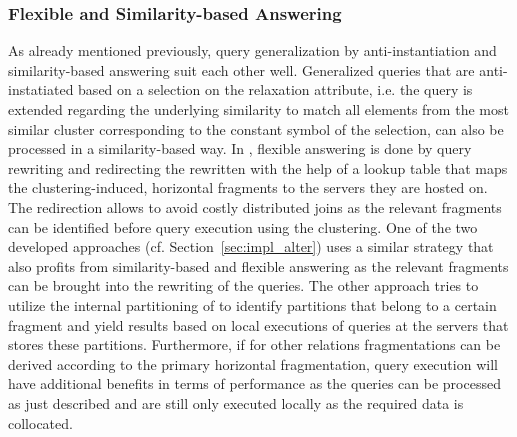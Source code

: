 \subsubsection{Flexible and Similarity-based Answering}
\label{sec:meth_fqa_fqsba}

As already mentioned previously, query generalization by anti-instantiation and similarity-based answering suit each other well. Generalized queries
that are anti-instatiated based on a selection on the relaxation attribute, i.e. the query is extended regarding the underlying similarity to match all
elements from the most similar cluster corresponding to the constant symbol of the selection, can also be processed in a similarity-based way. In
\cite{Wiese2014}, flexible answering is done by query rewriting and redirecting the rewritten with the help of a lookup table that maps the 
clustering-induced, horizontal fragments to the servers they are hosted on. The redirection allows to avoid costly distributed joins as the relevant
fragments can be identified before query execution using the clustering. One of the two developed approaches (cf. Section~\ref{sec:impl_alter}) uses a
similar strategy that also profits from similarity-based and flexible answering as the relevant fragments can be brought into the rewriting of the queries.
The other approach tries to utilize the internal partitioning of  to identify partitions that belong to a certain fragment and yield
results based on local executions of queries at the servers that stores these partitions.
Furthermore, if for other relations fragmentations can be derived according to the primary horizontal fragmentation, query execution will have additional 
benefits in terms of performance as the queries can be processed as just described and are still only executed locally as the required data is collocated.


